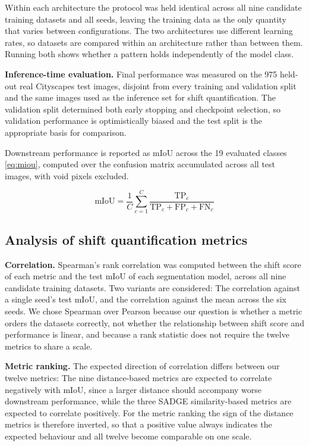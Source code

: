 \documentclass[conference]{IEEEtran}
\begin{document}
Within each architecture the protocol was held identical across all nine candidate training datasets and all seeds, leaving the training data as the only quantity that varies between configurations. The two architectures use different learning rates, so datasets are compared within an architecture rather than between them. Running both shows whether a pattern holds independently of the model class.

\textbf{Inference-time evaluation.} Final performance was measured on the 975 held-out real Cityscapes test images, disjoint from every training and validation split and the same images used as the inference set for shift quantification. The validation split determined both early stopping and checkpoint selection, so validation performance is optimistically biased and the test split is the appropriate basis for comparison.

Downstream performance is reported as mIoU across the 19 evaluated classes \eqref{eq:miou}, computed over the confusion matrix accumulated across all test images, with void pixels excluded.

\begin{equation}
\label{eq:miou}
\text{mIoU} = \frac{1}{C}\sum_{c=1}^{C} \frac{\text{TP}_c}{\text{TP}_c + \text{FP}_c + \text{FN}_c}
\end{equation}

\subsection{Analysis of shift quantification metrics}
\label{sec:analysis}
\textbf{Correlation.} Spearman's rank correlation was computed between the shift score of each metric and the test mIoU of each segmentation model, across all nine candidate training datasets. Two variants are considered: The correlation against a single seed's test mIoU, and the correlation against the mean across the six seeds. We chose Spearman over Pearson because our question is whether a metric orders the datasets correctly, not whether the relationship between shift score and performance is linear, and because a rank statistic does not require the twelve metrics to share a scale.

\textbf{Metric ranking.} The expected direction of correlation differs between our twelve metrics: The nine distance-based metrics are expected to correlate negatively with mIoU, since a larger distance should accompany worse downstream performance, while the three SADGE similarity-based metrics are expected to correlate positively. For the metric ranking the sign of the distance metrics is therefore inverted, so that a positive value always indicates the expected behaviour and all twelve become comparable on one scale.
\end{document}
